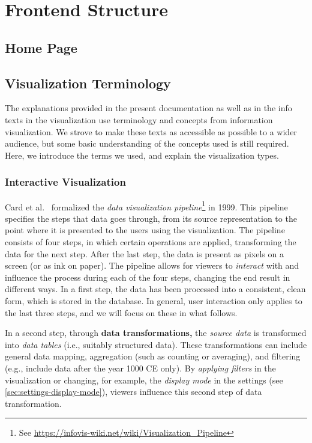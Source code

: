 \chapter{Frontend Structure}
\label{chapter:frontend}


\section{Home Page}


\section{Visualization Terminology}

The explanations provided in the present documentation as well as in the info texts in the visualization use terminology and concepts from information visualization.
We strove to make these texts as accessible as possible to a wider audience, but some basic understanding of the concepts used is still required.
Here, we introduce the terms we used, and explain the visualization types.

\subsection{Interactive Visualization}

Card et al.~\cite{Card_1999} formalized the \emph{data visualization pipeline}\footnote{See \url{https://infovis-wiki.net/wiki/Visualization_Pipeline}} in 1999.
This pipeline specifies the steps that data goes through, from its source representation to the point where it is presented to the users using the visualization.
The pipeline consists of four steps, in which certain operations are applied, transforming the data for the next step.
After the last step, the data is present as pixels on a screen (or as ink on paper).
The pipeline allows for viewers to \emph{interact} with and influence the process during each of the four steps, changing the end result in different ways.
In a first step, the data has been processed into a consistent, clean form, which is stored in the database.
In general, user interaction only applies to the last three steps, and we will focus on these in what follows.

In a second step, through \textbf{data transformations,} the \emph{source data} is transformed into \emph{data tables} (i.e., suitably structured data).
These transformations can include general data mapping, aggregation (such as counting or averaging), and filtering (e.g., include data after the year 1000 CE only).
By \emph{applying filters} in the visualization or changing, for example, the \emph{display mode} in the settings (see \cref{sec:settings-display-mode}), viewers influence this second step of data transformation.

